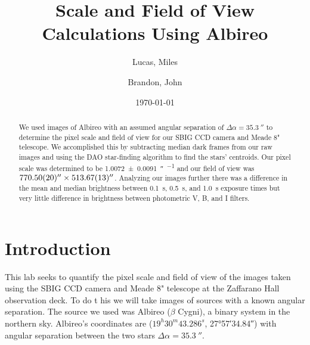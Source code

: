 \documentclass[%
aip,
jmp,
reprint,
floatfix,
]{revtex4-1}
\begin{document}
	
	\title[Scale and FOV Calculations Using Albireo]{Scale and Field of View Calculations Using Albireo}
	
	\author{Lucas, Miles}
	\author{Brandon, John}
	
	\date{\today}
	
	

	\begin{abstract}
	
	We used images of Albireo with an assumed angular separation of $\Delta\alpha = \SI{35.3}{\arcsecond}$ to determine the pixel scale and field of view for our SBIG CCD camera and Meade 8" telescope. We accomplished this by subtracting median dark frames from our raw images and using the DAO star-finding algorithm to find the stars' centroids. Our pixel scale was determined to be \SI{1.0072+-0.0091}{\arcsecond\per\pixel} and our field of view was $\SI{770.50+-0.20}{\arcsecond}\times\SI{513.67+-0.13}{\arcsecond}$. Analyzing our images further there was a difference in the mean and median brightness between \SI{0.1}{\second}, \SI{0.5}{\second}, and \SI{1.0}{\second} exposure times but very little difference in brightness between photometric V, B, and I filters. 
		
	\end{abstract}
	
	\maketitle
	

	\section{Introduction}
	
	This lab seeks to quantify the pixel scale and field of view of the images taken using the SBIG CCD camera and Meade 8" telescope at the Zaffarano Hall observation deck. To do t his we will take images of sources with a known angular separation. The source we used was Albireo ($\beta$ Cygni), a binary system in the northern sky. Albireo's coordinates are ($19^h30^m43.286^s$, \ang{+27;57;34.84}) with angular separation between the two stars $\Delta\alpha=\SI{35.3}{\arcsecond}$.
	
\end{document}
